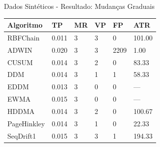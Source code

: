 \documentclass[10pt]{beamer}
\begin{document}
\begin{frame}{Dados Sintéticos - Resultado: Mudanças Graduais}
    \begin{table}[ht]
        \centering
        \begin{tabular}{llllll}

        \toprule
        Algoritmo              & TP                     & MR                     & VP                     & FP                     & ATR                    \\
        \midrule
        RBFChain               & 0.011                  & 3                      & 3                      & 0                      & 101.00                 \\
        ADWIN                  & 0.020                  & 3                      & 3                      & 2209                   & 1.00                   \\
        CUSUM                  & 0.014                  & 3                      & 2                      & 0                      & 83.33                  \\
        DDM                    & 0.014                  & 3                      & 1                      & 1                      & 58.33                  \\
        EDDM                   & 0.013                  & 3                      & 0                      & 0                      & ---                    \\
        EWMA                   & 0.015                  & 3                      & 0                      & 0                      & ---                    \\
        HDDMA                  & 0.014                  & 3                      & 2                      & 0                      & 100.67                 \\
        PageHinkley            & 0.014                  & 3                      & 1                      & 0                      & 22.33                  \\
        SeqDrift1              & 0.015                  & 3                      & 3                      & 1                      & 194.33                 \\
        \bottomrule


        \end{tabular}
        \end{table}
\end{frame}
\end{document}
